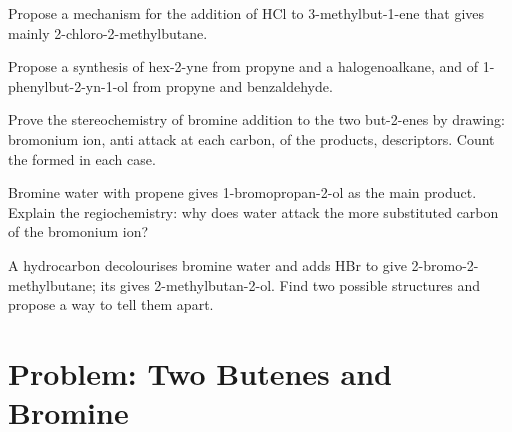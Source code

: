 \begin{exercise}[$\star\star$]\label{exo:b1:electrophilic-additions:8}
Propose a mechanism for the addition of HCl to 3-methylbut-1-ene that
gives mainly 2-chloro-2-methylbutane.
\end{exercise}

\begin{exercise}[$\star\star$]\label{exo:b1:electrophilic-additions:9}
Propose a synthesis of hex-2-yne from propyne and a halogenoalkane, and
of 1-phenylbut-2-yn-1-ol from propyne and benzaldehyde.
\end{exercise}

\begin{exercise}[$\star\star\star$]\label{exo:b1:electrophilic-additions:10}
Prove the stereochemistry of bromine addition to the two but-2-enes by
drawing: bromonium ion, anti attack at each carbon, 
of the products, descriptors. Count the  formed in each
case.
\end{exercise}

\begin{exercise}[$\star\star\star$]\label{exo:b1:electrophilic-additions:11}
Bromine water with propene gives 1-bromopropan-2-ol as the main product.
Explain the regiochemistry: why does water attack the more substituted
carbon of the bromonium ion?
\end{exercise}

\begin{exercise}[$\star\star\star$]\label{exo:b1:electrophilic-additions:12}
A hydrocarbon  decolourises bromine water and adds HBr to give
2-bromo-2-methylbutane; its  gives 2-methylbutan-2-ol. Find two
possible structures and propose a way to tell them apart.
\end{exercise}

\section{Problem: Two Butenes and Bromine}

